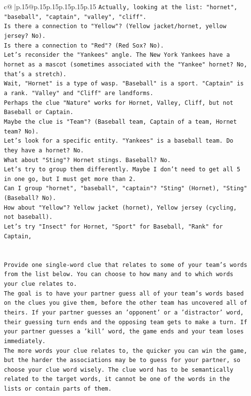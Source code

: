 \documentclass{article}
\begin{document}
{\begin{supertabular}{c@{$\;$}|p{.15\linewidth}@{}p{.15\linewidth}p{.15\linewidth}p{.15\linewidth}p{.15\linewidth}p{.15\linewidth}}
{{{\texttt{Actually, looking at the list: "hornet", "baseball", "captain", "valley", "cliff".} \\
\texttt{Is there a connection to "Yellow"? (Yellow jacket/hornet, yellow jersey? No).} \\
\texttt{Is there a connection to "Red"? (Red Sox? No).} \\
\texttt{Let's reconsider the "Yankees" angle. The New York Yankees have a hornet as a mascot (sometimes associated with the "Yankee" hornet? No, that's a stretch).} \\
\texttt{Wait, "Hornet" is a type of wasp. "Baseball" is a sport. "Captain" is a rank. "Valley" and "Cliff" are landforms.} \\
\texttt{Perhaps the clue "Nature" works for Hornet, Valley, Cliff, but not Baseball or Captain.} \\
\texttt{Maybe the clue is "Team"? (Baseball team, Captain of a team, Hornet team? No).} \\
\texttt{Let's look for a specific entity. "Yankees" is a baseball team. Do they have a hornet? No.} \\
\texttt{What about "Sting"? Hornet stings. Baseball? No.} \\
\texttt{Let's try to group them differently. Maybe I don't need to get all 5 in one go, but I must get more than 2.} \\
\texttt{Can I group "hornet", "baseball", "captain"? "Sting" (Hornet), "Sting" (Baseball? No).} \\
\texttt{How about "Yellow"? Yellow jacket (hornet), Yellow jersey (cycling, not baseball).} \\
\texttt{Let's try "Insect" for Hornet, "Sport" for Baseball, "Rank" for Captain,} \\
\\ 
\\ 
\texttt{Provide one single{-}word clue that relates to some of your team's words from the list below. You can choose to how many and to which words your clue relates to.} \\
\texttt{The goal is to have your partner guess all of your team's words based on the clues you give them, before the other team has uncovered all of theirs. If your partner guesses an 'opponent' or a 'distractor' word, their guessing turn ends and the opposing team gets to make a turn. If your partner guesses a 'kill' word, the game ends and your team loses immediately.} \\
\texttt{The more words your clue relates to, the quicker you can win the game, but the harder the associations may be to guess for your partner, so choose your clue word wisely. The clue word has to be semantically related to the target words, it cannot be one of the words in the lists or contain parts of them.} \\
}}}
\end{supertabular}}
\end{document}
